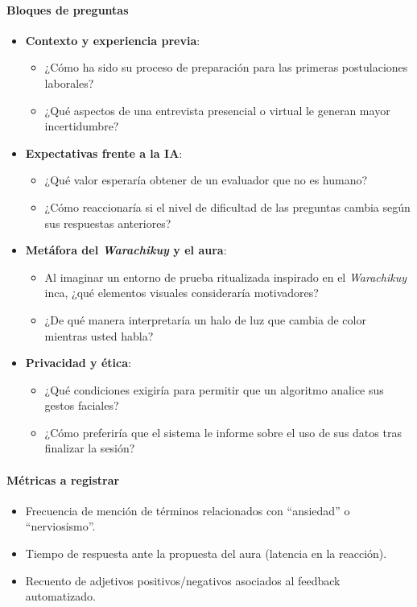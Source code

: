 \paragraph{Bloques de preguntas}
\begin{itemize}
  \item \textbf{Contexto y experiencia previa}:
        \begin{itemize}
          \item ¿Cómo ha sido su proceso de preparación para las
                primeras postulaciones laborales?
          \item ¿Qué aspectos de una entrevista presencial o virtual le
                generan mayor incertidumbre?
        \end{itemize}
  \item \textbf{Expectativas frente a la IA}:
        \begin{itemize}
          \item ¿Qué valor esperaría obtener de un evaluador que no
                es humano?
          \item ¿Cómo reaccionaría si el nivel de dificultad de las
                preguntas cambia según sus respuestas anteriores?
        \end{itemize}
  \item \textbf{Metáfora del \textit{Warachikuy} y el aura}:
        \begin{itemize}
          \item Al imaginar un entorno de prueba ritualizada inspirado
                en el \textit{Warachikuy} inca, ¿qué elementos visuales
                consideraría motivadores?
          \item ¿De qué manera interpretaría un halo de luz que cambia
                de color mientras usted habla?
        \end{itemize}
  \item \textbf{Privacidad y ética}:
        \begin{itemize}
          \item ¿Qué condiciones exigiría para permitir que un
                algoritmo analice sus gestos faciales?
          \item ¿Cómo preferiría que el sistema le informe sobre el
                uso de sus datos tras finalizar la sesión?
        \end{itemize}
\end{itemize}

\paragraph{Métricas a registrar}
\begin{itemize}
  \item Frecuencia de mención de términos relacionados con
        ``ansiedad'' o ``nerviosismo''.
  \item Tiempo de respuesta ante la propuesta del aura
        (latencia en la reacción).
  \item Recuento de adjetivos positivos/negativos asociados al
        feedback automatizado.
\end{itemize}

